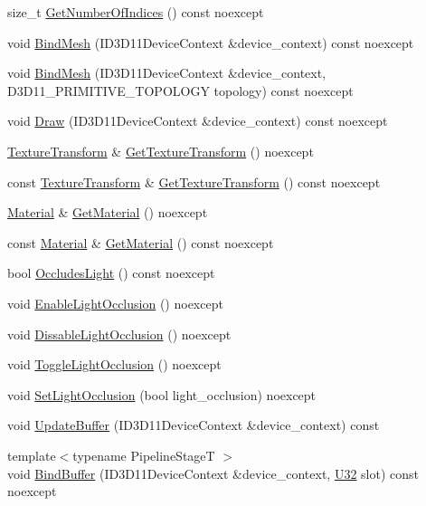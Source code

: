\begin{DoxyCompactItemize}
\item 
size\+\_\+t \hyperlink{classmage_1_1rendering_1_1_model_ab333b0fcc65bc20cb6c792b0094c5d1b}{Get\+Number\+Of\+Indices} () const noexcept
\item 
void \hyperlink{classmage_1_1rendering_1_1_model_a78defd61277c92a529c4811f1c7c391b}{Bind\+Mesh} (I\+D3\+D11\+Device\+Context \&device\+\_\+context) const noexcept
\item 
void \hyperlink{classmage_1_1rendering_1_1_model_a7793e3f1fa480cb4dc423845fc4de45f}{Bind\+Mesh} (I\+D3\+D11\+Device\+Context \&device\+\_\+context, D3\+D11\+\_\+\+P\+R\+I\+M\+I\+T\+I\+V\+E\+\_\+\+T\+O\+P\+O\+L\+O\+GY topology) const noexcept
\item 
void \hyperlink{classmage_1_1rendering_1_1_model_aaa10d71022d4f6ac8e51ec95861f3317}{Draw} (I\+D3\+D11\+Device\+Context \&device\+\_\+context) const noexcept
\item 
\hyperlink{classmage_1_1_texture_transform}{Texture\+Transform} \& \hyperlink{classmage_1_1rendering_1_1_model_a57e4069226ce9bade50bc17503378f08}{Get\+Texture\+Transform} () noexcept
\item 
const \hyperlink{classmage_1_1_texture_transform}{Texture\+Transform} \& \hyperlink{classmage_1_1rendering_1_1_model_adc18923fdb300d1eb753c9dcb9d30677}{Get\+Texture\+Transform} () const noexcept
\item 
\hyperlink{classmage_1_1rendering_1_1_material}{Material} \& \hyperlink{classmage_1_1rendering_1_1_model_af6e23f8327e82af4d6c2aa854329608c}{Get\+Material} () noexcept
\item 
const \hyperlink{classmage_1_1rendering_1_1_material}{Material} \& \hyperlink{classmage_1_1rendering_1_1_model_afcdf381e409cc7c7be878a60c1799c1b}{Get\+Material} () const noexcept
\item 
bool \hyperlink{classmage_1_1rendering_1_1_model_ac6238580ce9572b9274bf21852f73455}{Occludes\+Light} () const noexcept
\item 
void \hyperlink{classmage_1_1rendering_1_1_model_a6fc53c4d0d5983ecd2f1910002b4dcfc}{Enable\+Light\+Occlusion} () noexcept
\item 
void \hyperlink{classmage_1_1rendering_1_1_model_a4dc86a18b06ee751f2e208acc21f709e}{Dissable\+Light\+Occlusion} () noexcept
\item 
void \hyperlink{classmage_1_1rendering_1_1_model_ade8576cf32210153e65cd39b21940a67}{Toggle\+Light\+Occlusion} () noexcept
\item 
void \hyperlink{classmage_1_1rendering_1_1_model_a4064c86786e7dca7907435da1dce83a4}{Set\+Light\+Occlusion} (bool light\+\_\+occlusion) noexcept
\item 
void \hyperlink{classmage_1_1rendering_1_1_model_a31b3d4f544c8cfea4ad2054d594b2c53}{Update\+Buffer} (I\+D3\+D11\+Device\+Context \&device\+\_\+context) const
\item 
{\footnotesize template$<$typename Pipeline\+StageT $>$ }\\void \hyperlink{classmage_1_1rendering_1_1_model_a1247b104dff5f0eb1039b6e3ac0213ae}{Bind\+Buffer} (I\+D3\+D11\+Device\+Context \&device\+\_\+context, \hyperlink{namespacemage_a41c104c036fba3756a74e19f793eeaa1}{U32} slot) const noexcept
\end{DoxyCompactItemize}
